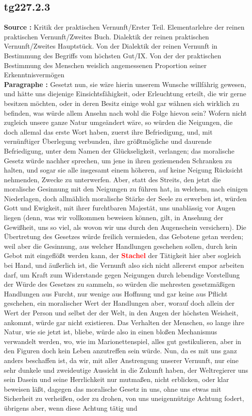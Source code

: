 \documentclass[a4paper,12pt,twoside]{book}
\newcommand{\match}[1]{\textcolor{red}{\textbf{#1}}}
\begin{document}
	\subsection*{tg227.2.3} 
	\textbf{Source : }Kritik der praktischen Vernunft/Erster Teil. Elementarlehre der reinen praktischen Vernunft/Zweites Buch. Dialektik der reinen praktischen Vernunft/Zweites Hauptstück. Von der Dialektik der reinen Vernunft in Bestimmung des Begriffs vom höchsten Gut/IX. Von der der praktischen Bestimmung des Menschen weislich angemessenen Proportion seiner Erkenntnisvermögen\\  
	
	\textbf{Paragraphe : }Gesetzt nun, sie wäre hierin unserem Wunsche willfährig gewesen, und hätte uns diejenige Einsichtsfähigkeit, oder Erleuchtung erteilt, die wir gerne besitzen möchten, oder in deren Besitz einige wohl gar wähnen sich wirklich zu befinden, was würde allem Ansehn nach wohl die Folge hievon sein? Wofern nicht zugleich unsere ganze Natur umgeändert wäre, so würden die Neigungen, die doch allemal das erste Wort haben, zuerst ihre Befriedigung, und, mit vernünftiger Überlegung verbunden, ihre größtmögliche und daurende Befriedigung, unter dem Namen der Glückseligkeit, verlangen; das moralische Gesetz würde nachher sprechen, um jene in ihren geziemenden Schranken zu halten, und sogar sie alle insgesamt einem höheren, auf keine Neigung Rücksicht nehmenden, Zwecke zu unterwerfen.  Aber, statt des Streits, den jetzt die moralische Gesinnung mit den Neigungen zu führen hat, in welchem, nach einigen Niederlagen, doch allmählich moralische Stärke der Seele zu erwerben ist, würden Gott und Ewigkeit, mit ihrer furchtbaren Majestät, uns unablässig vor Augen liegen (denn, was wir vollkommen beweisen können, gilt, in Ansehung der Gewißheit, uns so viel, als wovon wir uns durch den Augenschein versichern). Die Übertretung des Gesetzes würde freilich vermieden, das Gebotene getan werden; weil aber die Gesinnung, aus welcher Handlungen geschehen sollen, durch kein Gebot mit eingeflößt werden kann, der \match{Stachel} der Tätigkeit hier aber sogleich bei Hand, und äußerlich ist, die Vernunft also sich nicht allererst empor arbeiten darf, um Kraft zum Widerstande gegen Neigungen durch lebendige Vorstellung der Würde des Gesetzes zu sammeln, so würden die mehresten gesetzmäßigen Handlungen aus Furcht, nur wenige aus Hoffnung und gar keine aus Pflicht geschehen, ein moralischer Wert der Handlungen aber, worauf doch allein der Wert der Person und selbst der der Welt, in den Augen der höchsten Weisheit, ankommt, würde gar nicht existieren. Das Verhalten der Menschen, so lange ihre Natur, wie sie jetzt ist, bliebe, würde also in einen bloßen Mechanismus verwandelt werden, wo, wie im Marionettenspiel, alles gut gestikulieren, aber in den Figuren doch kein Leben anzutreffen sein würde. Nun, da es mit uns ganz anders beschaffen ist, da wir, mit aller Anstrengung unserer Vernunft, nur eine sehr dunkele und zweideutige Aussicht in die Zukunft haben, der Weltregierer uns sein Dasein und seine Herrlichkeit nur mutmaßen, nicht erblicken, oder klar beweisen läßt, dagegen das moralische Gesetz in uns, ohne uns etwas mit Sicherheit zu verheißen, oder zu drohen, von uns uneigennützige Achtung fodert, übrigens aber, wenn diese Achtung tätig und 
\end{document}
